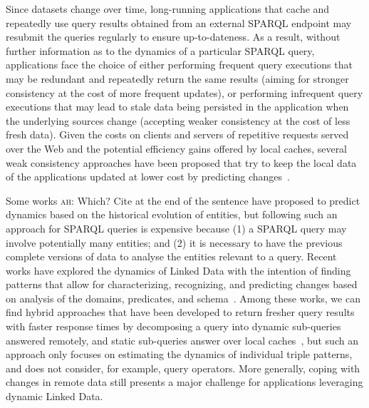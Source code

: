 \documentclass[runningheads]{llncs}
\newcommand{\ah}[1]{{\color{blue}\textsc{ah:} #1}}
\begin{document}
Since datasets change over time, long-running applications that cache and repeatedly use query results obtained from an external SPARQL endpoint may resubmit the queries regularly to ensure up-to-dateness. As a result, without further information as to the dynamics of a particular SPARQL query, applications face the choice of either performing frequent query executions that may be redundant and repeatedly return the same results (aiming for stronger consistency at the cost of more frequent updates), or performing infrequent query executions that may lead to stale data being persisted in the application when the underlying sources change (accepting weaker consistency at the cost of less fresh data). Given the costs on clients and servers of repetitive requests served over the Web  and the potential efficiency gains offered by local caches, several weak consistency approaches have been proposed that try to keep the local data of the applications updated at lower cost by predicting changes~\cite{KnuthHS16,DividinoGS15,NishiokaS17}.

Some works \ah{Which? Cite at the end of the sentence} have proposed to predict dynamics based on the historical evolution of entities, but following such an approach for SPARQL queries is expensive because (1) a SPARQL query may involve potentially many entities; and (2) it is necessary to have the previous complete versions of data to analyse the entities relevant to a query. Recent works have explored the dynamics of Linked Data with the intention of finding patterns that allow for characterizing, recognizing, and predicting changes based on analysis of the domains, predicates, and schema~\cite{UmbrichHHPD10,KaferAUOH13,NishiokaS16,NishiokaS17,GonzalezH18}. Among these works, we can find hybrid approaches that have been developed to return fresher query results with faster response times by decomposing a query into dynamic sub-queries answered remotely, and static sub-queries answer over local caches~\cite{UmbrichKHP12}, but such an approach only focuses on estimating the dynamics of individual triple patterns, and does not consider, for example, query operators. More generally, coping with changes in remote data still presents a major challenge for applications leveraging dynamic Linked Data.
\end{document}
